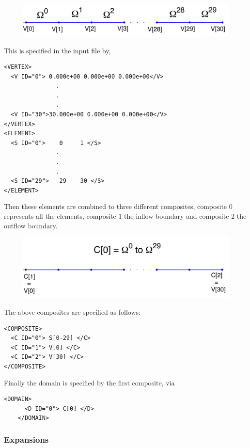 \begin{figure}
	\centering
	\includegraphics[width=\linewidth]{Figures/Domain.png}
\end{figure}

This is specified in the input file by,

\begin{lstlisting}[style=XmlStyle]
<VERTEX>
  <V ID="0"> 0.000e+00 0.000e+00 0.000e+00</V>
               .
               .
               . 
  <V ID="30">30.000e+00 0.000e+00 0.000e+00</V>
</VERTEX>
<ELEMENT>
  <S ID="0">    0     1 </S>
               .
               .
               . 
  <S ID="29">   29    30 </S>
</ELEMENT>
\end{lstlisting}

Then these elements are combined to three different composites, composite 0
represents all the elements, composite 1 the inflow boundary and composite 2 the
outflow boundary.

\begin{figure}
	\centering
	\includegraphics[width=\linewidth]{Figures/Composite.png}
\end{figure}

The above composites are specified as follows:
\begin{lstlisting}[style=XmlStyle]
<COMPOSITE>
  <C ID="0"> S[0-29] </C>
  <C ID="1"> V[0] </C>
  <C ID="2"> V[30] </C>
</COMPOSITE>
\end{lstlisting}

Finally the domain is specified by the first composite, via
\begin{lstlisting}[style=XmlStyle]
    <DOMAIN> 
      <D ID="0"> C[0] </D>
    </DOMAIN>
\end{lstlisting}

\subsubsection{Expansions}

